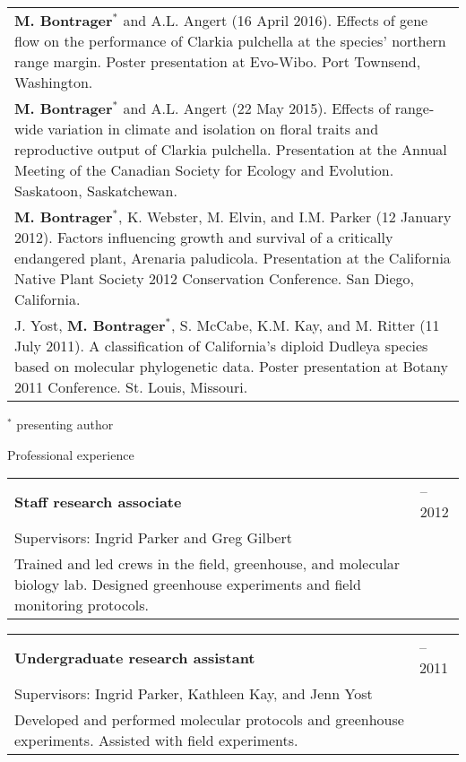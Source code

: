 \documentclass[letterpaper,11pt,oneside]{article}
\begin{document}
\noindent \begin{tabular}{@{} >{\raggedright\arraybackslash}p{16.51cm}}
\textbf{M. Bontrager}$^{*}$ and A.L. Angert (16 April 2016). Effects of gene flow on the performance of Clarkia pulchella at the species’ northern range margin. Poster presentation at Evo-Wibo. Port Townsend, Washington. \\
\textbf{M. Bontrager}$^{*}$ and A.L. Angert (22 May 2015). Effects of range-wide variation in climate and isolation on floral traits and reproductive output of Clarkia pulchella. Presentation at the Annual Meeting of the Canadian Society for Ecology and Evolution. Saskatoon, Saskatchewan. \\
\textbf{M. Bontrager}$^{*}$, K. Webster, M. Elvin, and I.M. Parker (12 January 2012). Factors influencing growth and survival of a critically endangered plant, Arenaria paludicola. Presentation at the California Native Plant Society 2012 Conservation Conference. San Diego, California. \\
J. Yost, \textbf{M. Bontrager}$^{*}$, S. McCabe, K.M. Kay, and M. Ritter (11 July 2011). A classification of California’s diploid Dudleya species based on molecular phylogenetic data. Poster presentation at Botany 2011 Conference. St. Louis, Missouri. \\
\end{tabular}

\newpage

\noindent $^{*}$ presenting author 
\bigskip
\bigskip



\bgroup
\noindent\Large{Professional experience}  
\normalsize
\bigskip

\normalsize
\noindent \begin{tabular}{@{} >{\raggedright\arraybackslash}p{14.41cm} >{\raggedleft\arraybackslash}p{1.7cm}}
\textbf{Staff research associate} & 2011--2012 \\
 Supervisors: Ingrid Parker and Greg Gilbert & \\
 Trained and led crews in the field, greenhouse, and molecular biology lab. Designed greenhouse experiments and field monitoring protocols. & \\
\end{tabular}
\smallskip

\noindent \begin{tabular}{@{} >{\raggedright\arraybackslash}p{14.41cm} >{\raggedleft\arraybackslash}p{1.7cm}}
 \textbf{Undergraduate research assistant} & 2010--2011 \\
 Supervisors: Ingrid Parker, Kathleen Kay, and Jenn Yost & \\
 Developed and performed molecular protocols and greenhouse experiments.
 Assisted with field experiments. & \\
\end{tabular}
\egroup
\bigskip
\bigskip
\end{document}
